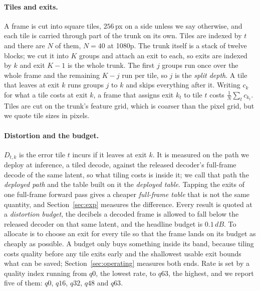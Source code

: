 \documentclass[10pt,twocolumn,letterpaper]{article}
\newcommand{\dB}{\,dB}
\begin{document}
\paragraph{Tiles and exits.} A frame is cut into square tiles, $256$\,px on a
side unless we say otherwise, and each tile is carried through part of the trunk
on its own. Tiles are indexed by $t$ and there are $N$ of them, $N{=}40$ at
1080p. The trunk itself is a stack of twelve blocks; we cut it into $K$ groups
and attach an exit to each, so exits are indexed by $k$ and exit $K-1$ is the
whole trunk. The first $j$ groups run once over the whole frame and the remaining
$K-j$ run per tile, so $j$ is the \emph{split depth}. A tile that leaves at exit
$k$ runs groups $j$ to $k$ and skips everything after it. Writing $c_k$ for what
a tile costs at exit $k$, a frame that assigns exit $k_t$ to tile $t$ costs
$\frac{1}{N}\sum_t c_{k_t}$. Tiles are cut on the trunk's feature grid, which is
coarser than the pixel grid, but we quote tile sizes in pixels.

\paragraph{Distortion and the budget.} $D_{t,k}$ is the error tile $t$ incurs if
it leaves at exit $k$. It is measured on the path we deploy at inference, a
tiled decode, against the released decoder's full-frame decode of the same
latent, so what tiling costs is inside it; we call that path the \emph{deployed
path} and the table built on it the \emph{deployed table}. Tapping the exits of
one full-frame forward pass gives a cheaper \emph{full-frame table} that is not
the same quantity, and Section~\ref{sec:exp} measures the difference. Every
result is quoted at a \emph{distortion budget}, the decibels a decoded frame is
allowed to fall below the released decoder on that same latent, and the headline
budget is $0.1\dB$. To allocate is to choose an exit for every tile so that the
frame lands on its budget as cheaply as possible. A budget only buys something
inside its band, because tiling costs quality before any tile exits early and the
shallowest usable exit bounds what can be saved; Section~\ref{sec:operating}
measures both ends. Rate is set by a quality index running from $q0$, the lowest
rate, to $q63$, the highest, and we report five of them: $q0$, $q16$, $q32$, $q48$ and
$q63$.
\end{document}
